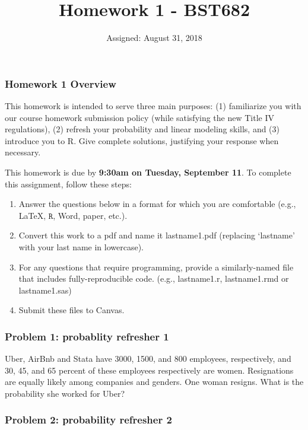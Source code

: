 \documentclass[]{article}
\title{Homework 1 - BST682}
\author{}
\date{Assigned: August 31, 2018}
\begin{document}
\maketitle

{
\setcounter{tocdepth}{3}
\tableofcontents
}
\subsubsection{Homework 1 Overview}\label{homework-1-overview}

This homework is intended to serve three main purposes: (1) familiarize
you with our course homework submission policy (while satisfying the new
Title IV regulations), (2) refresh your probability and linear modeling
skills, and (3) introduce you to R. Give complete solutions, justifying
your response when necessary.

This homework is due by \textbf{9:30am on Tuesday, September 11}. To
complete this assignment, follow these steps:

\begin{enumerate}
\def\labelenumi{\arabic{enumi}.}
\item
  Answer the questions below in a format for which you are comfortable
  (e.g., LaTeX, \(\texttt{R}\), Word, paper, etc.).
\item
  Convert this work to a pdf and name it lastname1.pdf (replacing
  `lastname' with your last name in lowercase).
\item
  For any questions that require programming, provide a similarly-named
  file that includes fully-reproducible code. (e.g., lastname1.r,
  lastname1.rmd or lastname1.sas)
\item
  Submit these files to Canvas.
\end{enumerate}

\subsubsection{Problem 1: probablity refresher
1}\label{problem-1-probablity-refresher-1}

Uber, AirBnb and Stata have 3000, 1500, and 800 employees, respectively,
and 30, 45, and 65 percent of these employees respectively are women.
Resignations are equally likely among companies and genders. One woman
resigns. What is the probability she worked for Uber?

\subsubsection{Problem 2: probability refresher
2}\label{problem-2-probability-refresher-2}
\end{document}
